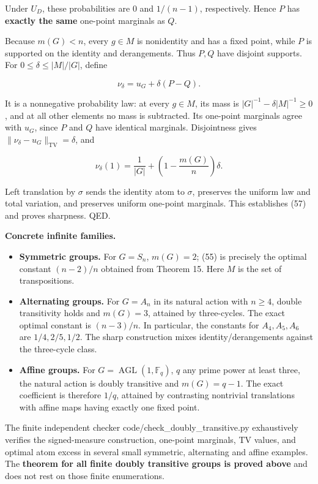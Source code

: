 \documentclass[
  11pt,
]{article}
\providecommand{\tightlist}{%
  \setlength{\itemsep}{0pt}\setlength{\parskip}{0pt}}
\begin{document}
Under \(U_D\), these probabilities are \(0\) and \(1/(n-1)\),
respectively. Hence \(P\) has \textbf{exactly the same} one-point
marginals as \(Q\).

Because \(m(G)<n\), every \(g\in M\) is nonidentity and has a fixed
point, while \(P\) is supported on the identity and derangements. Thus
\(P,Q\) have disjoint supports. For \(0\le\delta\le |M|/|G|\), define

\[
\nu_\delta=u_G+\delta(P-Q). \tag{59}
\]

It is a nonnegative probability law: at every \(g\in M\), its mass is
\(|G|^{-1}-\delta|M|^{-1}\ge0\), and at all other elements no mass is
subtracted. Its one-point marginals agree with \(u_G\), since \(P\) and
\(Q\) have identical marginals. Disjointness gives
\(\|\nu_\delta-u_G\|_{\mathrm{TV}}=\delta\), and

\[
\nu_\delta(1)=\frac1{|G|}+
\left(1-\frac{m(G)}n\right)\delta.
\]

Left translation by \(\sigma\) sends the identity atom to \(\sigma\),
preserves the uniform law and total variation, and preserves uniform
one-point marginals. This establishes (57) and proves sharpness. QED.

\textbf{Concrete infinite families.}

\begin{itemize}
\tightlist
\item
  \textbf{Symmetric groups.} For \(G=S_n\), \(m(G)=2\); (55) is
  precisely the optimal constant \((n-2)/n\) obtained from Theorem 15.
  Here \(M\) is the set of transpositions.
\item
  \textbf{Alternating groups.} For \(G=A_n\) in its natural action with
  \(n\ge4\), double transitivity holds and \(m(G)=3\), attained by
  three-cycles. The exact optimal constant is \((n-3)/n\). In
  particular, the constants for \(A_4,A_5,A_6\) are \(1/4,2/5,1/2\). The
  sharp construction mixes identity/derangements against the three-cycle
  class.
\item
  \textbf{Affine groups.} For \(G=\operatorname{AGL}(1,\mathbb F_q)\),
  \(q\) any prime power at least three, the natural action is doubly
  transitive and \(m(G)=q-1\). The exact coefficient is therefore
  \(1/q\), attained by contrasting nontrivial translations with affine
  maps having exactly one fixed point.
\end{itemize}

The finite independent checker code/check\_doubly\_transitive.py
exhaustively verifies the signed-measure construction, one-point
marginals, TV values, and optimal atom excess in several small
symmetric, alternating and affine examples. The \textbf{theorem for all
finite doubly transitive groups is proved above} and does not rest on
those finite enumerations.
\end{document}

